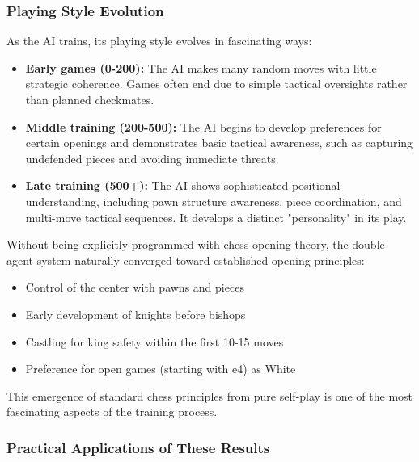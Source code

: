 \documentclass[11pt]{article}
\begin{document}
\subsubsection{Playing Style Evolution}

As the AI trains, its playing style evolves in fascinating ways:

\begin{itemize}
    \item \textbf{Early games (0-200):} The AI makes many random moves with little strategic coherence. Games often end due to simple tactical oversights rather than planned checkmates.
    
    \item \textbf{Middle training (200-500):} The AI begins to develop preferences for certain openings and demonstrates basic tactical awareness, such as capturing undefended pieces and avoiding immediate threats.
    
    \item \textbf{Late training (500+):} The AI shows sophisticated positional understanding, including pawn structure awareness, piece coordination, and multi-move tactical sequences. It develops a distinct "personality" in its play.
\end{itemize}

\begin{tcolorbox}[colback=green!5!white,colframe=green!75!black,title=Interesting Finding: Opening Preferences]
Without being explicitly programmed with chess opening theory, the double-agent system naturally converged toward established opening principles:

\begin{itemize}
    \item Control of the center with pawns and pieces
    \item Early development of knights before bishops
    \item Castling for king safety within the first 10-15 moves
    \item Preference for open games (starting with e4) as White
\end{itemize}

This emergence of standard chess principles from pure self-play is one of the most fascinating aspects of the training process.
\end{tcolorbox}

\subsubsection{Practical Applications of These Results}
\end{document}
